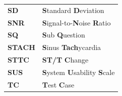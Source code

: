 \documentclass[oneside,a4paper,11pt]{book}
\begin{document}
\begin{table}[!h]
\begin{tabular}{ll}
\textbf{SD} & \textbf{S}tandard \textbf{D}eviation \\
\textbf{SNR} & \textbf{S}ignal-to-\textbf{N}oise \textbf{R}atio \\
\textbf{SQ} & \textbf{S}ub \textbf{Q}uestion \\ 
\textbf{STACH} & \textbf{S}inus \textbf{Tach}ycardia \\
\textbf{STTC} & \textbf{ST/T} \textbf{C}hange \\
\textbf{SUS} & \textbf{S}ystem \textbf{U}sability \textbf{S}cale \\
\textbf{TC} & \textbf{T}est \textbf{C}ase \\
  \end{tabular}
\end{table}

\newpage

	\mainmatter
	
	
    
	
	
	\appendix
	
	\backmatter
	\printbibliography[heading=bibintoc,title={References}]

    \printindex

    
\end{document}
